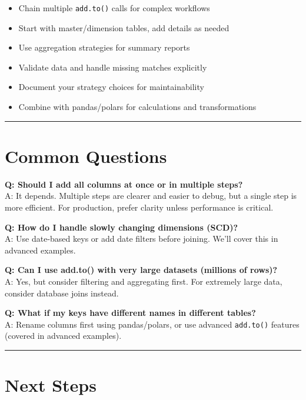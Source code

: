 \documentclass[
  letterpaper,
]{scrbook}
\providecommand{\tightlist}{%
  \setlength{\itemsep}{0pt}\setlength{\parskip}{0pt}}
\begin{document}
\begin{itemize}
\tightlist
\item
  Chain multiple \texttt{add.to()} calls for complex workflows
\item
  Start with master/dimension tables, add details as needed
\item
  Use aggregation strategies for summary reports
\item
  Validate data and handle missing matches explicitly
\item
  Document your strategy choices for maintainability
\item
  Combine with pandas/polars for calculations and transformations
\end{itemize}

\begin{center}\rule{0.5\linewidth}{0.5pt}\end{center}

\section{Common Questions}\label{common-questions-4}

\textbf{Q: Should I add all columns at once or in multiple steps?}\\
A: It depends. Multiple steps are clearer and easier to debug, but a
single step is more efficient. For production, prefer clarity unless
performance is critical.

\textbf{Q: How do I handle slowly changing dimensions (SCD)?}\\
A: Use date-based keys or add date filters before joining. We'll cover
this in advanced examples.

\textbf{Q: Can I use add.to() with very large datasets (millions of
rows)?}\\
A: Yes, but consider filtering and aggregating first. For extremely
large data, consider database joins instead.

\textbf{Q: What if my keys have different names in different tables?}\\
A: Rename columns first using pandas/polars, or use advanced
\texttt{add.to()} features (covered in advanced examples).

\begin{center}\rule{0.5\linewidth}{0.5pt}\end{center}

\section{Next Steps}\label{next-steps-6}
\end{document}
